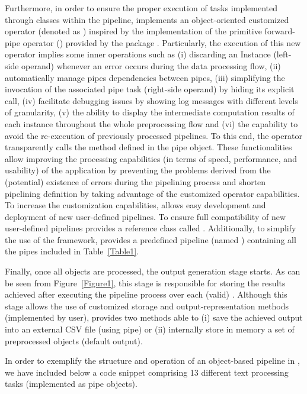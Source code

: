 Furthermore, in order to ensure the proper execution of tasks implemented through  classes within the pipeline,  implements an object-oriented customized operator (denoted as \code{\%>|\%}) inspired by the implementation of the primitive forward-pipe operator (\code{\%>\%}) provided by the  package \citep{magrittr}. Particularly, the execution of this new operator implies some inner operations such as (i) discarding an Instance (left-side operand) whenever an error occurs during the data processing flow, (ii) automatically manage pipes dependencies between pipes, (iii) simplifying the invocation of the associated pipe task (right-side operand) by hiding its explicit call, (iv) facilitate debugging issues by showing log messages with different levels of granularity, (v) the ability to display the intermediate computation results of each instance throughout the whole preprocessing flow and (vi) the capability to avoid the re-execution of previously processed pipelines. To this end, the operator transparently calls the  method defined in the pipe object. These functionalities allow improving the processing capabilities (in terms of speed, performance, and usability) of the application by preventing the problems derived from the (potential) existence of errors during the pipelining process and shorten pipelining definition by taking advantage of the customized operator capabilities. To increase the customization capabilities,  allows easy development and deployment of new user-defined pipelines. To ensure full compatibility of new user-defined pipelines  provides a reference class called . Additionally, to simplify the use of the framework,  provides a predefined pipeline (named ) containing all the pipes included in Table~\ref{Table1}.

Finally, once all  objects are processed, the output generation stage starts. As can be seen from Figure~\ref{Figure1}, this stage is responsible for storing the results achieved after executing the pipeline process over each (valid) . Although this stage allows the use of customized storage and output-representation methods (implemented by user),  provides two methods able to (i) save the achieved output into an external CSV file (using  pipe) or (ii) internally store in memory a set of preprocessed  objects (default output).

In order to exemplify the structure and operation of an object-based pipeline in , we have included below a code snippet comprising 13 different text processing tasks (implemented as pipe objects). 

